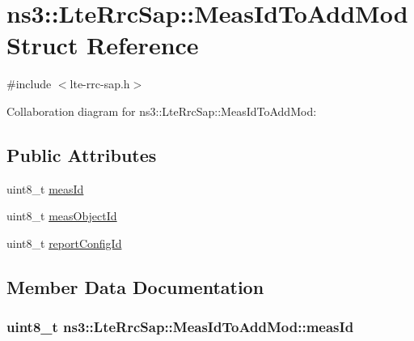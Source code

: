 \hypertarget{structns3_1_1LteRrcSap_1_1MeasIdToAddMod}{}\section{ns3\+:\+:Lte\+Rrc\+Sap\+:\+:Meas\+Id\+To\+Add\+Mod Struct Reference}
\label{structns3_1_1LteRrcSap_1_1MeasIdToAddMod}


{\ttfamily \#include $<$lte-\/rrc-\/sap.\+h$>$}



Collaboration diagram for ns3\+:\+:Lte\+Rrc\+Sap\+:\+:Meas\+Id\+To\+Add\+Mod\+:
\subsection*{Public Attributes}
\begin{DoxyCompactItemize}
\item 
uint8\+\_\+t \hyperlink{structns3_1_1LteRrcSap_1_1MeasIdToAddMod_a96e219313db16418ff046134309ccef0}{meas\+Id}
\item 
uint8\+\_\+t \hyperlink{structns3_1_1LteRrcSap_1_1MeasIdToAddMod_a11682d1fb66265d671a85a8955ca2b4c}{meas\+Object\+Id}
\item 
uint8\+\_\+t \hyperlink{structns3_1_1LteRrcSap_1_1MeasIdToAddMod_a5c632512c168d74bfe312d9ab7ac88ec}{report\+Config\+Id}
\end{DoxyCompactItemize}


\subsection{Member Data Documentation}
\subsubsection[{\texorpdfstring{meas\+Id}{measId}}]{\setlength{\rightskip}{0pt plus 5cm}uint8\+\_\+t ns3\+::\+Lte\+Rrc\+Sap\+::\+Meas\+Id\+To\+Add\+Mod\+::meas\+Id}\hypertarget{structns3_1_1LteRrcSap_1_1MeasIdToAddMod_a96e219313db16418ff046134309ccef0}{}\label{structns3_1_1LteRrcSap_1_1MeasIdToAddMod_a96e219313db16418ff046134309ccef0}
